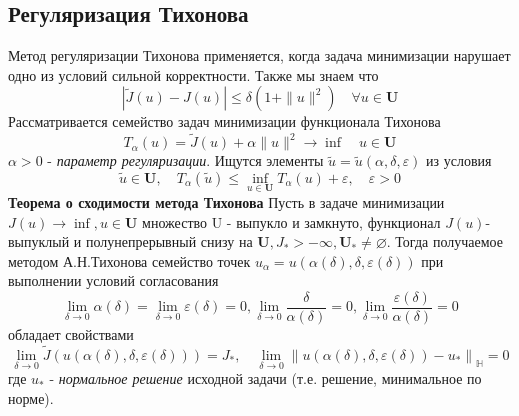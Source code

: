 \documentclass[A4]{article}
\begin{document}
\subsection{Регуляризация Тихонова}
Метод регуляризации Тихонова применяется, когда задача минимизации нарушает одно из условий сильной корректности. Также мы знаем что 
\begin{equation*}
|\tilde{J}(u)-J(u)|\leqslant\delta(1+\|u\|^2)\quad\forall u\in\mathbf{U}
\end{equation*}
Рассматривается семейство задач минимизации функционала Тихонова
\begin{equation*}
T_{\alpha}(u)=\tilde{J}(u)+\alpha\|u\|^2\rightarrow \inf\quad u\in\mathbf{U}
\end{equation*}
$\alpha>0$ - \emph{параметр регуляризации}. Ищутся элементы $\tilde{u}=\tilde{u}(\alpha,\delta,\varepsilon)$ из условия
\begin{equation*}
\tilde{u}\in\mathbf{U},\quad T_{\alpha}(\tilde{u})\leqslant\inf_{u\in\mathbf{U}}T_{\alpha}(u)+\varepsilon,\quad\varepsilon>0
\end{equation*}
\textbf{Теорема о сходимости метода Тихонова} Пусть в задаче минимизации $ J(u) \rightarrow \inf , u \in \mathbf{U} $ множество $ \mathrm{U} $ - выпукло и замкнуто, функционал $ J(u)$- выпуклый и полунепрерывный снизу на $ \mathbf{U}, J_{*}>-\infty, \mathbf{U}_{*} \neq \varnothing $.  Тогда получаемое методом А.Н.Тихонова семейство точек $ u_{\alpha}=u(\alpha(\delta), \delta, \varepsilon(\delta)) $ при выполнении условий согласования
\begin{equation*}
\lim _{\delta \rightarrow 0} \alpha(\delta)=\lim _{\delta \rightarrow 0} \varepsilon(\delta)=0, \lim _{\delta \rightarrow 0} \frac{\delta}{\alpha(\delta)}=0, \lim _{\delta \rightarrow 0} \frac{\varepsilon(\delta)}{\alpha(\delta)}=0
\end{equation*}
обладает свойствами
\begin{equation*}
\lim _{\delta \rightarrow 0} \tilde{J}(u(\alpha(\delta), \delta, \varepsilon(\delta)))=J_{*}, \quad \lim _{\delta \rightarrow 0}\left\|u(\alpha(\delta), \delta, \varepsilon(\delta))-u_{*}\right\|_{\mathbb{H}}=0
\end{equation*}
где $ u_{*}$ - \emph{нормальное решение} исходной задачи (т.е. решение, минимальное по норме).
\end{document}
